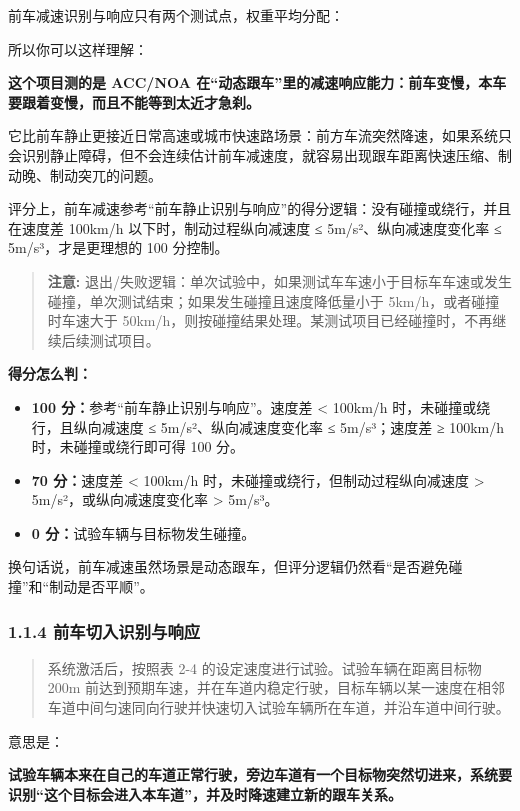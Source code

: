 前车减速识别与响应只有两个测试点，权重平均分配：

所以你可以这样理解：

\textbf{这个项目测的是 ACC/NOA 在“动态跟车”里的减速响应能力：前车变慢，本车要跟着变慢，而且不能等到太近才急刹。}

它比前车静止更接近日常高速或城市快速路场景：前方车流突然降速，如果系统只会识别静止障碍，但不会连续估计前车减速度，就容易出现跟车距离快速压缩、制动晚、制动突兀的问题。

评分上，前车减速参考“前车静止识别与响应”的得分逻辑：没有碰撞或绕行，并且在速度差 100km/h 以下时，制动过程纵向减速度 ≤ 5m/s²、纵向减速度变化率 ≤ 5m/s³，才是更理想的 100 分控制。

\begin{quote}
  \textbf{注意:} 退出/失败逻辑：单次试验中，如果测试车车速小于目标车车速或发生碰撞，单次测试结束；如果发生碰撞且速度降低量小于 5km/h，或者碰撞时车速大于 50km/h，则按碰撞结果处理。某测试项目已经碰撞时，不再继续后续测试项目。
\end{quote}

\textbf{得分怎么判：}

\begin{itemize}
  \item \textbf{100 分：}参考“前车静止识别与响应”。速度差 < 100km/h 时，未碰撞或绕行，且纵向减速度 ≤ 5m/s²、纵向减速度变化率 ≤ 5m/s³；速度差 ≥ 100km/h 时，未碰撞或绕行即可得 100 分。
  \item \textbf{70 分：}速度差 < 100km/h 时，未碰撞或绕行，但制动过程纵向减速度 > 5m/s²，或纵向减速度变化率 > 5m/s³。
  \item \textbf{0 分：}试验车辆与目标物发生碰撞。
\end{itemize}

换句话说，前车减速虽然场景是动态跟车，但评分逻辑仍然看“是否避免碰撞”和“制动是否平顺”。

\subsubsection{1.1.4 前车切入识别与响应}

\begin{quote}
  系统激活后，按照表 2-4 的设定速度进行试验。试验车辆在距离目标物 200m 前达到预期车速，并在车道内稳定行驶，目标车辆以某一速度在相邻车道中间匀速同向行驶并快速切入试验车辆所在车道，并沿车道中间行驶。
\end{quote}

意思是：

\textbf{试验车辆本来在自己的车道正常行驶，旁边车道有一个目标物突然切进来，系统要识别“这个目标会进入本车道”，并及时降速建立新的跟车关系。}

